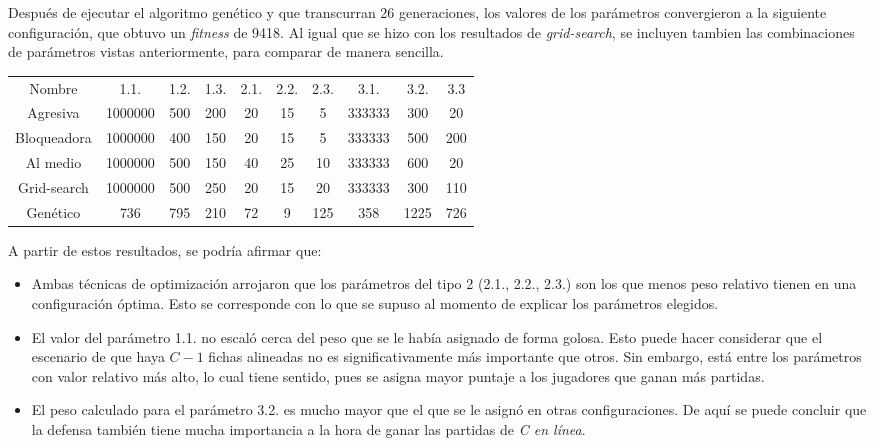 \documentclass[12pt,a4paper]{article}
\begin{document}
    Después de ejecutar el algoritmo genético y que transcurran 26 generaciones, los valores de los parámetros convergieron a la siguiente configuración, que obtuvo un \textit{fitness} de 9418. Al igual que se hizo con los resultados de \textit{grid-search}, se incluyen tambien las combinaciones de parámetros vistas anteriormente, para comparar de manera sencilla.
    
    \begin{center}
		\begin{tabular}{ | c || c | c | c | c | c | c | c | c | c | }
		\hline
		Nombre &  1.1. &  1.2. &  1.3. &  2.1. &  2.2. &  2.3. &  3.1. &  3.2. &  3.3 \\ \hhline{|=#=|=|=|=|=|=|=|=|=|}
		    Agresiva &  1000000 &  500 &  200 &  20 &  15 &  5 &  333333 &  300 &  20 \\ \hline
		    Bloqueadora &  1000000 &  400 &  150 &  20 &  15 &  5 &  333333 &  500 &  200 \\ \hline
		    Al medio &  1000000 &  500 &  150 &  40 &  25 &  10 &  333333 &  600 &  20 \\ \hline
		    Grid-search &  1000000 &  500 &  250 &  20 &  15 &  20 &  333333 &  300 &  110 \\ \hline
		    Genético &  736 &  795 &  210 &  72 &  9 &  125 &  358 &  1225 &  726 \\ \hline
		\end{tabular}
    \end{center}
    
    A partir de estos resultados, se podría afirmar que:
        \begin{itemize}
            \item Ambas técnicas de optimización arrojaron que los parámetros del tipo 2 (2.1., 2.2., 2.3.) son los que menos peso relativo tienen en una configuración óptima. Esto se corresponde con lo que se supuso al momento de explicar los parámetros elegidos.
            \item El valor del parámetro 1.1. no escaló cerca del peso que se le había asignado de forma golosa. Esto puede hacer considerar que el escenario de que haya $C-1$ fichas alineadas no es significativamente más importante que otros. Sin embargo, está entre los parámetros con valor relativo más alto, lo cual tiene sentido, pues se asigna mayor puntaje a los jugadores que ganan más partidas.
            \item El peso calculado para el parámetro 3.2. es mucho mayor que el que se le asignó en otras configuraciones. De aquí se puede concluir que la defensa también tiene mucha importancia a la hora de ganar las partidas de \textit{C en línea}.
        \end{itemize}
    
\end{document}

